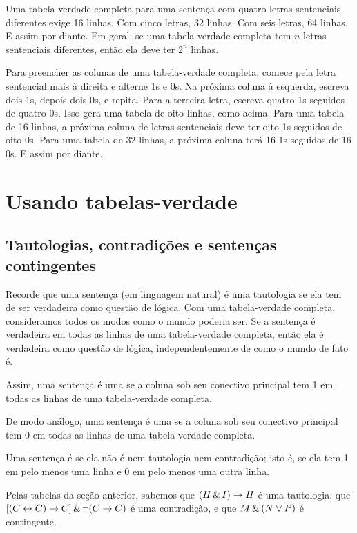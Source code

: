 Uma tabela-verdade completa para uma sentença com quatro letras sentenciais diferentes exige 16 linhas. Com cinco letras, 32 linhas. Com seis letras, 64 linhas. E assim por diante. Em geral: se uma tabela-verdade completa tem $n$ letras sentenciais diferentes, então ela deve ter $2^n$ linhas.

Para preencher as colunas de uma tabela-verdade completa, comece pela letra sentencial mais à direita e alterne 1s e 0s. Na próxima coluna à esquerda, escreva dois 1s, depois dois 0s, e repita. Para a terceira letra, escreva quatro 1s seguidos de quatro 0s. Isso gera uma tabela de oito linhas, como acima. Para uma tabela de 16 linhas, a próxima coluna de letras sentenciais deve ter oito 1s seguidos de oito 0s. Para uma tabela de 32 linhas, a próxima coluna terá 16 1s seguidos de 16 0s. E assim por diante.


\section{Usando tabelas-verdade}

\subsection{Tautologias, contradições e sentenças contingentes}

Recorde que uma sentença (em linguagem natural) é uma tautologia se ela tem de ser verdadeira como questão de lógica. Com uma tabela-verdade completa, consideramos todos os modos como o mundo poderia ser. Se a sentença é verdadeira em todas as linhas de uma tabela-verdade completa, então ela é verdadeira como questão de lógica, independentemente de como o mundo de fato é.

Assim, uma sentença é uma  se a coluna sob seu conectivo principal tem 1 em todas as linhas de uma tabela-verdade completa.

De modo análogo, uma sentença é uma  se a coluna sob seu conectivo principal tem 0 em todas as linhas de uma tabela-verdade completa.

Uma sentença é  se ela não é nem tautologia nem contradição; isto é, se ela tem 1 em pelo menos uma linha e 0 em pelo menos uma outra linha.

Pelas tabelas da seção anterior, sabemos que $(H\,\&\, I)\rightarrow H$ é uma tautologia, que $[(C\leftrightarrow C) \rightarrow C] \,\&\, \neg(C \rightarrow C)$ é uma contradição, e que $M \,\&\, (N \vee P)$ é contingente.


